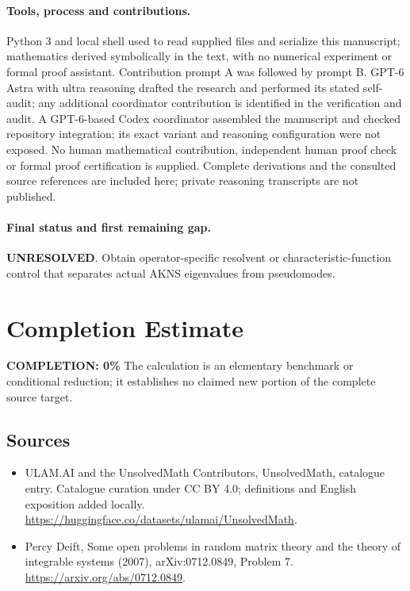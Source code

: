 \documentclass[11pt]{article}
\begin{document}
\paragraph{Tools, process and contributions.}
Python 3 and local shell used to read supplied files and serialize this manuscript; mathematics derived symbolically in the text, with no numerical experiment or formal proof assistant. Contribution prompt A was followed by prompt B. GPT-6 Astra with ultra reasoning drafted the research and performed its stated self-audit; any additional coordinator contribution is identified in the verification and audit. A GPT-6-based Codex coordinator assembled the manuscript and checked repository integration; its exact variant and reasoning configuration were not exposed. No human mathematical contribution, independent human proof check or formal proof certification is supplied. Complete derivations and the consulted source references are included here; private reasoning transcripts are not published.

\paragraph{Final status and first remaining gap.}
\textbf{UNRESOLVED}. Obtain operator-specific resolvent or characteristic-function control that separates actual AKNS eigenvalues from pseudomodes.

\section{Completion Estimate}
\noindent\textbf{COMPLETION: 0\%}
The calculation is an elementary benchmark or conditional reduction; it establishes no claimed new portion of the complete source target.

\subsection{Sources}
\begin{itemize}
\item[\hypertarget{source:statement:1}{S1}] ULAM.AI and the UnsolvedMath Contributors, UnsolvedMath, catalogue entry. Catalogue curation under CC BY 4.0; definitions and English exposition added locally.
\url{https://huggingface.co/datasets/ulamai/UnsolvedMath}.
\item[\hypertarget{source:statement:2}{S2}] Percy Deift, Some open problems in random matrix theory and the theory of integrable systems (2007), arXiv:0712.0849, Problem 7.
\url{https://arxiv.org/abs/0712.0849}.
\end{itemize}
\label{end:statement}
\end{document}
